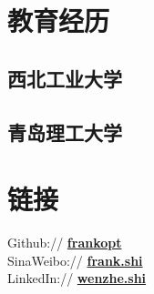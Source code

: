 \documentclass[]{deedy-resume-openfont}
\begin{document}
%
%
\lastupdated

%
%

%
%

\begin{minipage}[t]{0.25\textwidth} 


\section{教育经历} 
\sectionsep

\subsection{西北工业大学}
\sectionsep

\subsection{青岛理工大学}
\sectionsep


\section{链接}
\sectionsep 
Github:// \href{https://www.weibo.com/274822998}{\bf frankopt} \\
SinaWeibo:// \href{https://github.com/frankopt}{\bf frank.shi} \\
LinkedIn://  \href{https://www.linkedin.com/in/wenzheshi/}{\bf wenzhe.shi} \\



\end{minipage}
\end{document}
